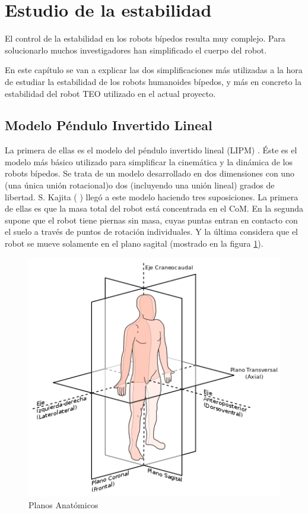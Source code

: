 \section{Estudio de la estabilidad}

El control de la estabilidad en los robots bípedos resulta muy complejo. Para solucionarlo muchos investigadores han simplificado el cuerpo del robot. 

En este capítulo se van a explicar las dos simplificaciones más utilizadas a la hora de estudiar la estabilidad de los robots humanoides bípedos, y más en concreto la estabilidad del robot TEO utilizado en el actual proyecto.



\subsection{Modelo Péndulo Invertido Lineal}

La primera de ellas es el modelo del péndulo invertido lineal (LIPM)%
. Éste es el modelo más básico utilizado para simplificar la cinemática y la dinámica de los robots bípedos. Se trata de un modelo desarrollado en dos dimensiones con uno (una única unión rotacional)o dos (incluyendo una unión lineal) grados de libertad. S. Kajita (%
) llegó a este modelo haciendo tres suposiciones. La primera de ellas es que la masa total del robot está concentrada en el CoM. En la segunda supone que el robot tiene piernas sin masa, cuyas puntas entran en contacto con el suelo a través de puntos de rotación individuales. Y la última considera que el robot se mueve solamente en el plano sagital (mostrado en la figura \ref{figura41}).

\begin{figure}[H]
\centering
\includegraphics[scale=0.6]{imagenes/apartado_4/41_plano_anatomico_sagital3}
\caption{Planos Anatómicos}
\label{figura41}
\end{figure}

